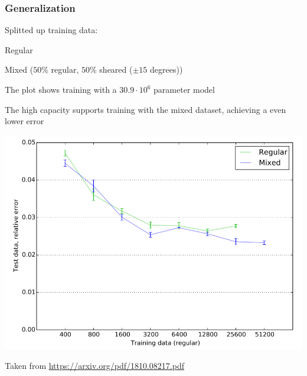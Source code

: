 \begin{frame}
    \frametitle{Generalization}
    \vspace*{0.8cm}
\begin{multicols}{2}
    Splitted up training data:
    \begin{PraesentationAufzaehlung}
		\item Regular
		\item Mixed ($50\%$ regular, $50\%$ sheared ($\pm 15$ degrees))
	\end{PraesentationAufzaehlung}
	
	The plot shows training with a $30.9 \cdot 10^6$ parameter model
	
	The high capacity supports training with the mixed dataset, \newline
	achieving a even lower error
	
	 
	
    \vfill\columnbreak
	\includegraphics[width=\columnwidth, height=.6\textheight]{./Ressourcen/Praesentation/Bilder/generaliz_plot.png}
\end{multicols}
\vspace*{-1.4cm}
    Taken from \url{https://arxiv.org/pdf/1810.08217.pdf}
\end{frame}
\clearpage



